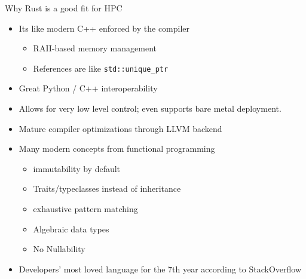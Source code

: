 \documentclass[compress,aspectratio=169]{beamer}
\begin{document}
\begin{frame}{Why Rust is a good fit for HPC}
  \begin{itemize}
      \pause
    \item Its like modern C++ enforced by the compiler
      \begin{itemize}
        \item RAII-based memory management
        \item References are like \texttt{std::unique\_ptr}
      \end{itemize}
      \pause
    \item Great Python / C++ interoperability
      \pause
    \item Allows for very low level control; even supports bare metal deployment.
      \pause
    \item Mature compiler optimizations through LLVM backend
      \pause
    \item Many modern concepts from functional programming
      \begin{itemize}
        \item immutability by default
        \item Traits/typeclasses instead of inheritance
        \item exhaustive pattern matching
        \item Algebraic data types
        \item No Nullability
      \end{itemize}
      \pause
      \item Developers' most loved language for the 7th year according to StackOverflow \cite{sosurvey}
  \end{itemize}
\end{frame}
\end{document}
